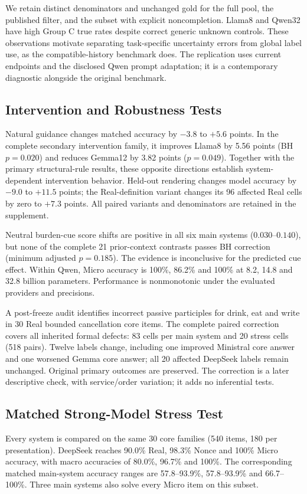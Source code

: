 \documentclass[sigconf,anonymous,review]{acmart}
\begin{document}
We retain distinct denominators and unchanged gold for the full pool, the published filter, and the subset with explicit noncompletion. Llama8 and Qwen32 have high Group C true rates despite correct generic unknown controls. These observations motivate separating task-specific uncertainty errors from global label use, as the compatible-history benchmark does. The replication uses current endpoints and the disclosed Qwen prompt adaptation; it is a contemporary diagnostic alongside the original benchmark.

\subsection{Intervention and Robustness Tests}
\label{sec:robustness}
Natural guidance changes matched accuracy by $-3.8$ to $+5.6$ points. In the complete secondary intervention family, it improves Llama8 by 5.56 points (BH $p=0.020$) and reduces Gemma12 by 3.82 points ($p=0.049$). Together with the primary structural-rule results, these opposite directions establish system-dependent intervention behavior. Held-out rendering changes model accuracy by $-9.0$ to $+11.5$ points; the Real-definition variant changes its 96 affected Real cells by zero to $+7.3$ points. All paired variants and denominators are retained in the supplement.

Neutral burden-cue score shifts are positive in all six main systems ($0.030$--$0.140$), but none of the complete 21 prior-context contrasts passes BH correction (minimum adjusted $p=0.185$). The evidence is inconclusive for the predicted cue effect. Within Qwen, Micro accuracy is 100\%, 86.2\% and 100\% at 8.2, 14.8 and 32.8 billion parameters. Performance is nonmonotonic under the evaluated providers and precisions.

A post-freeze audit identifies incorrect passive participles for drink, eat and write in 30 Real bounded cancellation core items. The complete paired correction covers all inherited formal defects: 83 cells per main system and 20 stress cells (518 pairs). Twelve labels change, including one improved Ministral core answer and one worsened Gemma core answer; all 20 affected DeepSeek labels remain unchanged. Original primary outcomes are preserved. The correction is a later descriptive check, with service/order variation; it adds no inferential tests.

\subsection{Matched Strong-Model Stress Test}
Every system is compared on the same 30 core families (540 items, 180 per presentation). DeepSeek reaches 90.0\% Real, 98.3\% Nonce and 100\% Micro accuracy, with macro accuracies of 80.0\%, 96.7\% and 100\%. The corresponding matched main-system accuracy ranges are 57.8--93.9\%, 57.8--93.9\% and 66.7--100\%. Three main systems also solve every Micro item on this subset.
\end{document}
